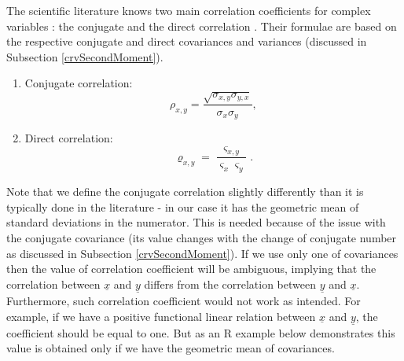 \documentclass[
]{book}
\begin{document}
The scientific literature knows two main correlation coefficients for complex variables \citep{Schreier2010}: the conjugate and the direct correlation \citep[the former is typically just called ``correlation'', while the latter is known in the literature as ``pseudo-correlation'', see, for example,][]{Chung2020}. Their formulae are based on the respective conjugate and direct covariances and variances (discussed in Subsection \ref{crvSecondMoment}).

\begin{enumerate}
\def\labelenumi{\arabic{enumi}.}
\item
  Conjugate correlation:
  \begin{equation}
   \rho_{x,y} = \frac{\sqrt{\sigma_{x,y} \sigma_{y,x}}}{\sigma_x \sigma_y},
   \label{eq:correlationConjugate}
  \end{equation}
\item
  Direct correlation:
  \begin{equation}
   \varrho_{x,y} = \frac{\varsigma_{x,y}}{\varsigma_x \varsigma_y}.
   \label{eq:correlationDirect}
  \end{equation}
\end{enumerate}

Note that we define the conjugate correlation slightly differently than it is typically done in the literature - in our case it has the geometric mean of standard deviations in the numerator. This is needed because of the issue with the conjugate covariance (its value changes with the change of conjugate number as discussed in Subsection \ref{crvSecondMoment}). If we use only one of covariances \citep[as done, for example, by][]{Panchev1971} then the value of correlation coefficient will be ambiguous, implying that the correlation between \(\underline{x}\) and \(\underline{y}\) differs from the correlation between \(\underline{y}\) and \(\underline{x}\). Furthermore, such correlation coefficient would not work as intended. For example, if we have a positive functional linear relation between \(\underline{x}\) and \(\underline{y}\), the coefficient should be equal to one. But as an R example below demonstrates this value is obtained only if we have the geometric mean of covariances.
\end{document}
